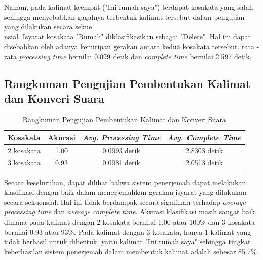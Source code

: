 Namun, pada kalimat keempat ("Ini rumah saya") terdapat kosakata yang salah sehingga menyebabkan gagalnya terbentuk kalimat tersebut dalam pengujian yang dilakukan secara sekue\\nsial. Isyarat kosakata "Rumah" diklasifikasikan sebagai "Delete". Hal ini dapat disebabkan oleh adanya kemiripan gerakan antara kedua kosakata tersebut. rata - rata \emph{processing time} bernilai 0.099 detik dan \emph{complete time} bernilai 2.597 detik.

\subsection{Rangkuman Pengujian Pembentukan Kalimat dan Konveri Suara}
\label{sec:analisikalimatsuara}

\begin{longtable}{|c|c|c|c|}
  \caption{Rangkuman Pengujian Pembentukan Kalimat dan Konveri Suara}
  \label{tb:evaluasiKalimatdanSuara}                                   \\
  \hline
  \rowcolor[HTML]{C0C0C0}
  \textbf{Kosakata} & \textbf{Akurasi} & \emph{\textbf{Avg. Processing Time}} & \emph{\textbf{Avg. Complete Time}} \\
  \hline
  2 kosakata & 1.00 & 0.0993 detik & 2.8303 detik \\
  3 kosakata & 0.93 & 0.0981 detik & 2.0513 detik \\
  \hline
\end{longtable}

Secara keseluruhan, dapat dilihat bahwa sistem penerjemah dapat melakukan klasifikasi dengan baik dalam menerjemahkan gerakan isyarat yang dilakukan secara sekuensial. Hal ini tidak berdampak secara signifikan terhadap \emph{average processing time} dan \emph{average complete time}. Akurasi klasifikasi masih sangat baik, dimana pada kalimat dengan 2 kosakata bernilai 1.00 atau 100\% dan 3 kosakata bernilai 0.93 atau 93\%. Pada kalimat dengan 3 kosakata, hanya 1 kalimat yang tidak berhasil untuk dibentuk, yaitu kalimat "Ini rumah saya" sehingga tingkat keberhasilan sistem penerjemah dalam membentuk kalimat adalah sebesar 85.7\%.

